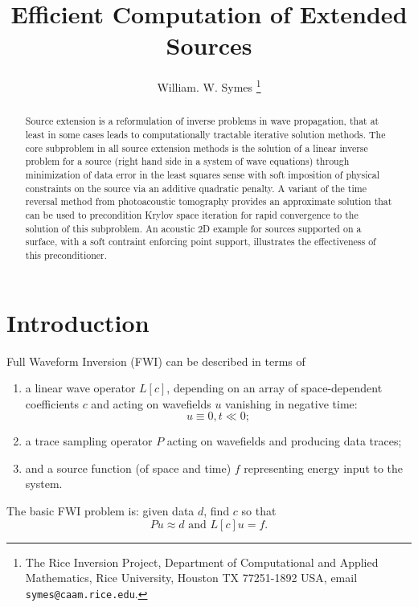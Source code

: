 \title{Efficient Computation of Extended Sources}
\author{William. W. Symes \thanks{The Rice Inversion Project,
Department of Computational and Applied Mathematics, Rice University,
Houston TX 77251-1892 USA, email {\tt symes@caam.rice.edu}.}}



\maketitle
\begin{abstract}
Source extension is a reformulation of inverse problems in wave propagation, that at least in some cases leads to computationally tractable iterative solution methods. The core subproblem in all source extension methods is the solution of a linear inverse problem for a source (right hand side in a system of wave equations) through minimization of data error in the least squares sense with soft imposition of physical constraints on the source via an additive quadratic penalty. A variant of the time reversal method from photoacoustic tomography provides an approximate solution that can be used to precondition Krylov space iteration for rapid convergence to the solution of this subproblem. An acoustic 2D example for sources supported on a surface, with a soft contraint enforcing point support, illustrates the effectiveness of this preconditioner.
\end{abstract}

\section{Introduction}
Full Waveform Inversion (FWI) can be described in terms of 
\begin{enumerate}
\item a linear wave operator $L[c]$, depending on an array of space-dependent coefficients $c$ and acting on wavefields $u$ vanishing in negative time:
\begin{equation}
\label{eqn:init}
u \equiv 0, t \ll 0; 
\end{equation}
\item a trace sampling operator $P$ acting on wavefields and producing data traces;
\item and a source function (of space and time) $f$ representing energy input to the system. 
\end{enumerate}
The basic FWI problem is: given data $d$, find $c$ so that 
\begin{equation}
\label{eqn:fwi}
Pu \approx d \mbox{ and } L[c]u = f.
\end{equation}

